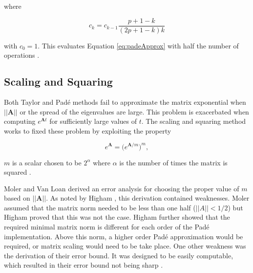 \noindent where

\begin{equation*}
    c_{k} = c_{k-1}\frac{p+1-k}{(2p+1-k)k}
\end{equation*}

\noindent with $c_{0} = 1$. This evaluates Equation \ref{eq:padeApprox} with half the number of operations \cite{exokit}.


\subsection{Scaling and Squaring}
Both Taylor and Pad\'e methods fail to approximate the matrix exponential when $||\boldsymbol{A}||$ or the spread of the eigenvalues are large. This problem is exacerbated when computing $e^{\boldsymbol{A}t}$ for sufficiently large values of $t$. The scaling and squaring method works to fixed these problem by exploiting the property

\begin{equation*}
    e^{\boldsymbol{A}} = \big( e^{\boldsymbol{A}/m}\big)^{m}
    \label{eq:scalingAndSquaring},
\end{equation*}

\noindent $m$ is a scalar chosen to be $2^{\alpha}$ where $\alpha$ is the number of times the matrix is squared \cite{moler2003}. 

Moler and Van Loan \cite{moler2003} derived an error analysis for choosing the proper value of $m$ based on $||\boldsymbol{A}||$. As noted by Higham \cite{higham2005}, this derivation contained weaknesses. Moler assumed that the matrix norm needed to be less than one half ($||A|| < 1/2$) but Higham proved that this was not the case. Higham further showed that the required minimal matrix norm is different for each order of the Pad\'e implementation. Above this norm, a higher order Pad\'e approximation would be required, or matrix scaling would need to be take place. One other weakness was the derivation of their error bound. It was designed to be easily computable, which resulted in their error bound not being sharp \cite{higham2005}. 


